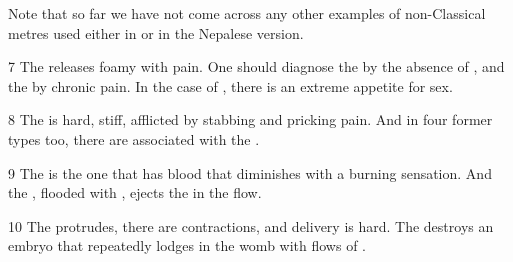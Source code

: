Note that so far we have not come across any other examples of non-Classical metres used either in \cite{vulgate} or in the Nepalese version. 

\begin{translation}
\item [7] The  releases foamy  with pain. 
One should diagnose the  by the absence of , and the  by chronic pain.
In the case of , there is an extreme appetite for sex.

\item [8] The  is hard, stiff, afflicted by stabbing and pricking pain.
And in four former types too, there are  associated with the .

\item [9] The  is the one that has blood that diminishes with a burning sensation.
And the , flooded with , ejects the  in the flow. 

\item [10] The  protrudes, there are contractions, and delivery is hard.
The  destroys an embryo that repeatedly lodges in the womb with flows of .


\end{translation}
